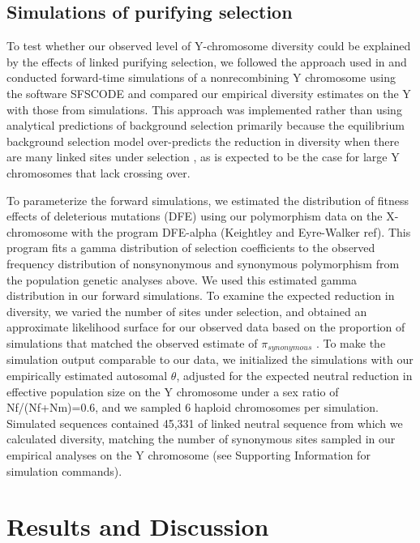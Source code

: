 \documentclass[9pt,twocolumn,twoside]{gsajnl}
\begin{document}
\subsection*{Simulations of purifying selection}
To test whether our observed level of Y-chromosome diversity could be explained by the effects of linked purifying selection, we followed the approach used in \citep{Wilsonsayres2014} and conducted forward-time simulations of a nonrecombining Y chromosome using the software SFSCODE \citep{hernandez2008flexible} and compared our empirical diversity estimates on the Y with those from simulations. This approach was implemented rather than using analytical predictions of background selection primarily because the equilibrium background selection model over-predicts the reduction in diversity when there are many linked sites under selection \citep{KaiserCharlesworth}, as is expected to be the case for large Y chromosomes that lack crossing over.

To parameterize the forward simulations, we estimated the distribution of fitness effects of deleterious mutations (DFE) using our polymorphism data on the X-chromosome with the program DFE-alpha (Keightley and Eyre-Walker ref). This program fits a gamma distribution of selection coefficients to the observed frequency distribution of nonsynonymous and synonymous polymorphism from the population genetic analyses above. We used this estimated gamma distribution in our forward simulations. To examine the expected reduction in diversity, we varied the number of sites under selection, and obtained an approximate likelihood surface for our observed data based on the proportion of simulations that matched the observed estimate of $\pi_{synonymous}$ . To make the simulation output comparable to our data, we initialized the simulations with our empirically estimated autosomal $\theta$, adjusted for the expected neutral reduction in effective population size on the Y chromosome under a sex ratio of Nf/(Nf+Nm)=0.6, and we sampled 6 haploid chromosomes per simulation. Simulated sequences contained 45,331 of linked neutral sequence from which we calculated diversity, matching the number of synonymous sites sampled in our empirical analyses on the Y chromosome (see Supporting Information for simulation commands).



\section*{Results and Discussion}
\end{document}
